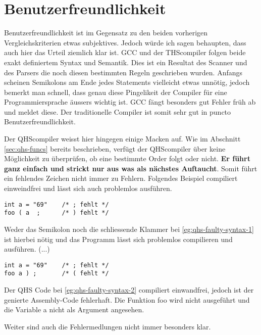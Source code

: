 \section{Benutzerfreundlichkeit}
Benutzerfreundlichkeit ist im Gegensatz zu den beiden vorherigen Vergleichskriterien etwas subjektives. Jedoch würde ich sagen behaupten, dass auch hier das Urteil ziemlich klar ist.
GCC und der THScompiler folgen beide exakt definiertem Syntax und Semantik. Dies ist ein Resultat des Scanner und des Parsers die noch diesen bestimmten Regeln geschrieben wurden.
Anfangs scheinen Semikolons am Ende jedes Statements vielleicht etwas unnötig, jedoch bemerkt man schnell, dass genau diese Pingelikeit der Compiler für eine Programmiersprache äussers wichtig ist.
GCC fängt besonders gut Fehler früh ab und meldet diese. Der traditionelle Compiler ist somit sehr gut in puncto Benutzerfreundlichkeit.

Der QHScompiler weisst hier hingegen einige Macken auf. Wie im Abschnitt \ref{sec:qhs-funcs} bereits beschrieben, verfügt der QHScompiler über keine Möglichkeit zu überprüfen, ob eine bestimmte Order folgt oder nicht.
\textbf{Er führt ganz einfach und strickt nur aus was als nächstes Auftaucht}. Somit führt ein fehlendes Zeichen nicht immer zu Fehlern. Folgendes Beispiel compiliert einweindfrei und lässt sich auch problemlos ausführen.

\begin{lstlisting}[language=QHS, caption=QHS mit fehlerhaftem Syntax, label=eg:qhs-faulty-syntax-1]
int a = "69"    /* ; fehlt */
foo ( a  ;      /* ) fehlt */
\end{lstlisting}

Weder das Semikolon noch die schliessende Klammer bei \ref{eg:qhs-faulty-syntax-1} ist hierbei nötig und das Programm lässt sich problemlos compilieren und ausführen. (...)

\begin{lstlisting}[language=QHS, caption=QHS mit fehlerhaftem Syntax, label=eg:qhs-faulty-syntax-2]
int a = "69"    /* ; fehlt */
foo a ) ;       /* ( fehlt */
\end{lstlisting}

Der QHS Code bei \ref{eg:qhs-faulty-syntax-2} compiliert einwandfrei, jedoch ist der genierte Assembly-Code fehlerhaft. Die Funktion foo wird nicht ausgeführt und die Variable a nicht als Argument angesehen.

Weiter sind auch die Fehlermedlungen nicht immer besonders klar.


